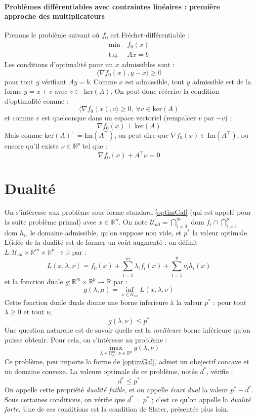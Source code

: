 \paragraph{Problèmes différentiables avec contraintes linéaires : première approche des multiplicateurs}
Prenons le problème suivant où $f_0$ est Fréchet-différentiable :
\[\begin{aligned}
	\min\ & f_0(x)\\
	\text{t.q. } & Ax=b
\end{aligned}\]
Les conditions d'optimalité pour un $x$ admissibles sont :
	\[\langle \nabla f_0(x),y-x\rangle\geq 0\]
pour tout $y$ vérifiant $Ay=b$. Comme $x$ est admissible, tout $y$ admissible est de la forme $y=x+v$ avec $v\in$ ker$(A)$. On peut donc réécrire la condition d'optimalité comme :
	\[\langle \nabla f_0(x),v\rangle\geq 0,\ \forall v\in\text{ker}(A)\]
et comme $v$ est quelconque dans un espace vectoriel (rempalcer $v$ par $-v$) : 
	\[\nabla f_0(x)\perp\text{ker}(A)\]
Mais comme ker$(A)^\perp=$Im$(A^\intercal)$, on peut dire que $\nabla f_0(x)\in$Im$(A^\intercal)$, ou encore qu'il existe $\nu\in\mathbb{R}^p$ tel que :
	\[\nabla f_0(x)+A^\intercal \nu=0\]

\section{Dualité}
On s'intéresse aux problème sous forme standard \eqref{optimGal} (qui est appelé pour la suite problème primal) avec $x\in\mathbb{R}^n$. On note $\mathcal{U}_{ad}=\bigcap_{i=0}^m$ dom $f_i\cap \bigcap_{i=1}^p $ dom $h_i$, le domaine admissible, qu'on suppose non vide, et $p^*$ la valeur optimale. L(idée de la dualité est de former un coût augmenté : on définit $L:\mathcal{U}_{ad}\times\mathbb{R}^m\times\mathbb{R}^p\to\mathbb{R}$ par :
	\[L(x,\lambda,\nu)=f_0(x)+\sum_{i=1}^m \lambda_i f_i(x)+\sum_{i=1}^p \nu_i h_i(x)\]
et la fonction duale $g:\mathbb{R}^m\times\mathbb{R}^p\to\mathbb{R}$ par :
	\[g(\lambda,\mu)=\inf_{x\in\mathcal{U}_{ad}} L(x,\lambda,\nu)\]
Cette fonction duale duale donne une borne inferieure à la valeur $p^*$ : pour tout $\lambda\geq 0$ et tout $\nu$, \[g(\lambda,\nu)\leq p^*\]
Une question naturelle est de savoir quelle est la \textit{meilleure} borne inférieure qu'on puisse obtenir. Pour cela, on s'intéresse au problème :
\begin{equation}\label{maxDual}
	\max_{\lambda\in\mathbb{R}^m_+,\ \nu\in\mathbb{R}^p} g(\lambda,\nu)
\end{equation}
Ce problème, peu importe la forme de \eqref{optimGal}, admet un obejectif concave et un domaine convexe. La valeure optimale de ce problème, notée $d^*$, vérifie :
	\[d^*\leq p^*\]
On appelle cette propriété \textit{dualité faible}, et on appelle \textit{écart dual} la valeur $p^*-d^*$. \\
Sous certaines conditions, on vérifie que $d^*=p^*$ ; c'est ce qu'on appelle la \textit{dualité forte}. Une de ces conditions est la condition de Slater, présentée plus loin. 

